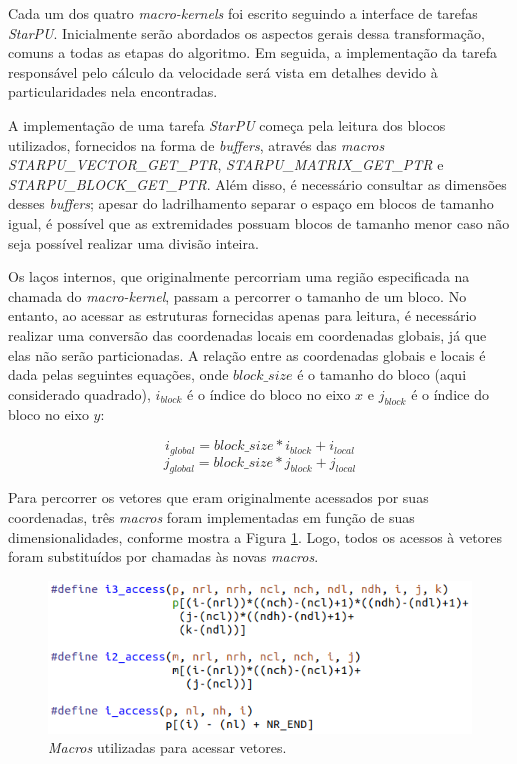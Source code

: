 \documentclass[cic,tc]{iiufrgs}
\begin{document}
Cada um dos quatro \textit{macro-kernels} foi escrito seguindo a interface de tarefas \textit{StarPU}. Inicialmente serão abordados
os aspectos gerais dessa transformação, comuns a todas as etapas do algoritmo. Em seguida, a implementação da tarefa responsável
pelo cálculo da velocidade será vista em detalhes devido à particularidades nela encontradas.

A implementação de uma tarefa \textit{StarPU} começa pela leitura dos blocos utilizados, fornecidos na forma de \textit{buffers}, através 
das \textit{macros STARPU\_VECTOR\_GET\_PTR}, \textit{STARPU\_MATRIX\_GET\_PTR} e \textit{STARPU\_BLOCK\_GET\_PTR}. Além disso, é
necessário consultar as dimensões desses \textit{buffers}; apesar do ladrilhamento separar o espaço em blocos de tamanho igual, é possível
que as extremidades possuam blocos de tamanho menor caso não seja possível realizar uma divisão inteira.

Os laços internos, que originalmente percorriam uma região especificada na chamada do \textit{macro-kernel}, passam a percorrer o
tamanho de um bloco. No entanto, ao acessar as estruturas fornecidas apenas para leitura, é necessário realizar uma conversão das
coordenadas locais em coordenadas globais, já que elas não serão particionadas. A relação entre as coordenadas globais e locais é dada
pelas seguintes equações, onde $block\_size$ é o tamanho do bloco (aqui considerado quadrado), $i_{block}$ é o índice do bloco no eixo $x$
e $j_{block}$ é o índice do bloco no eixo $y$:

\[ i_{global} = block\_size * i_{block} + i_{local} \]
\[ j_{global} = block\_size * j_{block} + j_{local} \]


Para percorrer os vetores que eram originalmente acessados por suas coordenadas, três \textit{macros} foram implementadas em função
de suas dimensionalidades, conforme mostra a Figura \ref{fig:access}. Logo, todos os acessos à vetores foram substituídos por
chamadas às novas \textit{macros}.

\begin{figure}[!htb]
  \caption{\textit{Macros} utilizadas para acessar vetores.}
    \begin{center} 
      \includegraphics[width=34em]{access}
    \end{center}
    \label{fig:access}
\end{figure}
\end{document}

